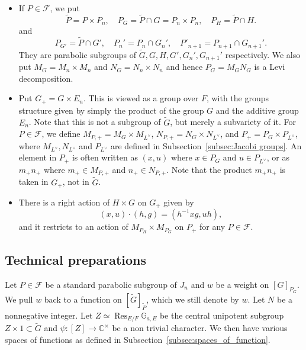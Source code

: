 \documentclass[letterpaper,11pt]{amsart}
\newcommand{\bG}{\mathbb{G}}
\newcommand{\C}{\mathbb{C}}
\newcommand{\cF}{\mathcal{F}}
\newcommand{\<}{\negthickspace}
\DeclareMathOperator{\Res}{Res}
\theoremstyle{definition}
\theoremstyle{plain}
\theoremstyle{remark}
\numberwithin{equation}{section}
\begin{document}
\begin{itemize}
\item If $P \in \cF$, we put
        \[
        \widetilde{P} = P \times P_n, \quad
        P_G = \widetilde{P} \cap G = P_n \times P_n, \quad
        P_H = \widetilde{P} \cap H.
    \]
    and
        \[
        P_{G'}=\widetilde{P} \cap G', \quad P_n' = P_n \cap G_n',
        \quad P'_{n+1}=P_{n+1} \cap
        G_{n+1}'.
        \]
    They are parabolic subgroups of $\widetilde{G},G,H,G',G_n',G_{n+1}'$
    respectively. We also put $M_G = M_n \times M_n$ and $N_G = N_n \times N_n$
    and hence $P_G = M_G N_G$ is a Levi decomposition.

\item Put $G_+ = G \times E_n$. This is viewed as a group over $F$, with the
    groups structure given by simply the product of the group $G$ and the
    additive group $E_n$. Note that this is not a subgroup of $\widetilde{G}$, but
    merely a subvariety of it. For $P \in \cF$, we
    define $M_{P, +} = M_{G} \times M_{L^\vee}$, $N_{P,+} = N_G \times N_{L^\vee}$,
    and $P_+ = P_G \times P_{L^\vee}$, where $M_{L^\vee}, N_{L^\vee}$ and
    $P_{L^\vee}$ are defined in
    Subsection~\ref{subsec:Jacobi groups}. An element in $P_+$ is often written as
    $(x, u)$ where $x \in P_G$ and $u \in P_{L^\vee}$, or as $m_+n_+$ where
    $m_+ \in M_{P, +}$ and $n_+ \in N_{P, +}$. Note that the product $m_+ n_+$ is
    taken in $G_+$, not in $\widetilde{G}$.

\item There is a right action of $H \times G$ on $G_+$ given by
        \[
        (x,u) \cdot (h,g) = (h^{-1}xg,uh),
        \]
    and it restricts to an action of $M_{P_H} \times M_{P_G}$
    on $P_+$ for any $P \in \cF$.
\end{itemize}



\subsection{Technical preparations}

Let $P \in \cF$ be a standard parabolic subgroup of $J_n$ and $w$ be a weight on $[G]_{P_G}$. We pull $w$ back to a
function on $[\widetilde{G}]_{\widetilde{P}}$, which we still denote by $w$.
Let $N$ be a nonnegative integer. Let $Z \simeq \Res_{E/F} \bG_{a, E}$ be the central unipotent subgroup
$Z \times 1 \subset \widetilde{G}$ and $\psi: [Z] \to \C^\times$ be a non trivial
character. We then have various spaces of functions as defined in
Subsection~\ref{subsec:spaces_of_function}.
\end{document}
